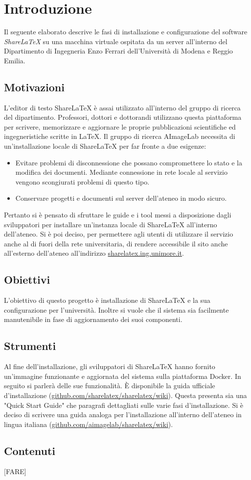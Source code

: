 \chapter{Introduzione}
\label{Introduzione}
\thispagestyle{empty}

Il seguente elaborato descrive le fasi di installazione e configurazione del software \emph{ShareLaTeX} su una macchina virtuale ospitata da un server all'interno del Dipartimento di Ingegneria Enzo Ferrari dell'Università di Modena e Reggio Emilia.

\section{Motivazioni}
L'editor di testo ShareLaTeX è assai utilizzato all'interno del gruppo di ricerca del dipartimento. Professori, dottori e dottorandi utilizzano questa piattaforma per scrivere, memorizzare e aggiornare le proprie pubblicazioni scientifiche ed ingegneristiche scritte in \LaTeX. Il gruppo di ricerca AImageLab necessita di un'installazione locale di ShareLaTeX per far fronte a due esigenze:
\begin{itemize}
    \item Evitare problemi di disconnessione che possano compromettere lo stato e la modifica dei documenti. Mediante connessione in rete locale al servizio vengono scongiurati problemi di questo tipo.
    \item Conservare progetti e documenti sul server dell'ateneo in modo sicuro.
\end{itemize}
Pertanto si è pensato di sfruttare le guide e i tool messi a disposizione dagli sviluppatori per installare un'instanza locale di ShareLaTeX all'interno dell'ateneo. Si è poi deciso, per permettere agli utenti di utilizzare il servizio anche al di fuori della rete universitaria, di rendere accessibile il sito anche all'esterno dell'ateneo all'indirizzo \url{sharelatex.ing.unimore.it}.

\section{Obiettivi}
L'obiettivo di questo progetto è installazione di ShareLaTeX e la sua configurazione per l'università. Inoltre si vuole che il sistema sia facilmente manutenibile in fase di aggiornamento dei suoi componenti.

\section{Strumenti}
Al fine dell'installazione, gli sviluppatori di ShareLaTeX hanno fornito un'immagine funzionante e aggiornata del sistema sulla piattaforma Docker. In seguito si parlerà delle sue funzionalità. È disponibile la guida ufficiale d'installazione (\url{github.com/sharelatex/sharelatex/wiki}). Questa presenta sia una "Quick Start Guide" che paragrafi dettagliati sulle varie fasi d'installazione. Si è deciso di scrivere una guida analoga per l'installazione all'interno dell'ateneo in lingua italiana (\url{github.com/aimagelab/sharelatex/wiki}).

\section{Contenuti}
\huge [FARE]
\normalsize


